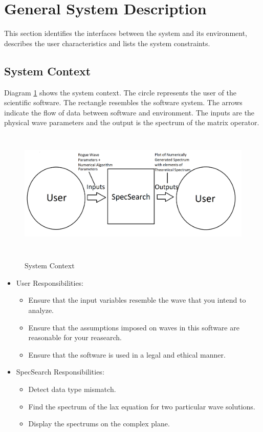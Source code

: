 \documentclass[12pt]{article}
\begin{document}
\section{General System Description}

This section identifies the interfaces between the system and its environment,
describes the user characteristics and lists the system constraints.

\subsection{System Context} 
Diagram \ref{context} shows the system context. The circle represents the user 
of the 
scientific software. The rectangle resembles the software system. The arrows 
indicate the flow of data between software and environment. The inputs are the 
physical wave parameters and the output is the spectrum of the matrix operator.
 \begin{figure}[h!]
	\begin{center}
		{
			\includegraphics[width=15cm,height=6cm]{SystemContext.png}
		} 
	\caption{System Context}
	\label{context}
	\end{center}
 \end{figure}

\begin{itemize}
\item User Responsibilities:
\begin{itemize}
\item Ensure that the input variables resemble the wave that you intend 
to analyze.
\item Ensure that the assumptions imposed on waves in this software are 
reasonable 
for your reasearch.
\item Ensure that the software is used in a legal and ethical manner.

\end{itemize}
\item SpecSearch Responsibilities:

\begin{itemize}
\item Detect data type mismatch. 
\item Find the spectrum of the lax equation for two particular wave solutions. 
\item Display the spectrums on the complex plane.
\end{itemize}
\end{itemize}
\end{document}
